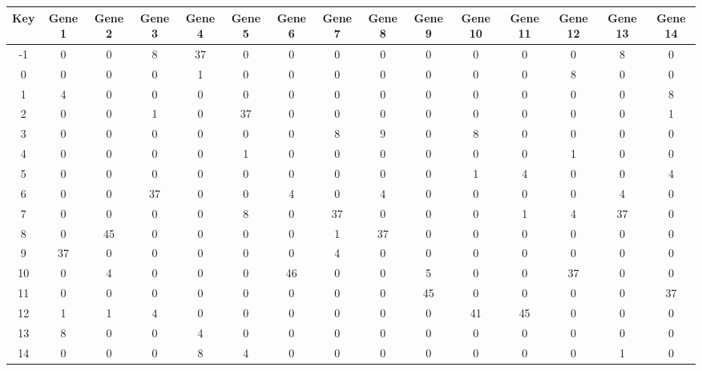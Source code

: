 \begin{tabular}{|c|c|c|c|c|c|c|c|c|c|c|c|c|c|c|}
\hline
Key & Gene 1 & Gene 2 & Gene 3 & Gene 4 & Gene 5 & Gene 6 & Gene 7 & Gene 8 & Gene 9 & Gene 10 & Gene 11 & Gene 12 & Gene 13 & Gene 14 \\
\hline
-1 & 0 & 0 & 8 & 37 & 0 & 0 & 0 & 0 & 0 & 0 & 0 & 0 & 8 & 0 \\
0 & 0 & 0 & 0 & 1 & 0 & 0 & 0 & 0 & 0 & 0 & 0 & 8 & 0 & 0 \\
1 & 4 & 0 & 0 & 0 & 0 & 0 & 0 & 0 & 0 & 0 & 0 & 0 & 0 & 8 \\
2 & 0 & 0 & 1 & 0 & 37 & 0 & 0 & 0 & 0 & 0 & 0 & 0 & 0 & 1 \\
3 & 0 & 0 & 0 & 0 & 0 & 0 & 8 & 9 & 0 & 8 & 0 & 0 & 0 & 0 \\
4 & 0 & 0 & 0 & 0 & 1 & 0 & 0 & 0 & 0 & 0 & 0 & 1 & 0 & 0 \\
5 & 0 & 0 & 0 & 0 & 0 & 0 & 0 & 0 & 0 & 1 & 4 & 0 & 0 & 4 \\
6 & 0 & 0 & 37 & 0 & 0 & 4 & 0 & 4 & 0 & 0 & 0 & 0 & 4 & 0 \\
7 & 0 & 0 & 0 & 0 & 8 & 0 & 37 & 0 & 0 & 0 & 1 & 4 & 37 & 0 \\
8 & 0 & 45 & 0 & 0 & 0 & 0 & 1 & 37 & 0 & 0 & 0 & 0 & 0 & 0 \\
9 & 37 & 0 & 0 & 0 & 0 & 0 & 4 & 0 & 0 & 0 & 0 & 0 & 0 & 0 \\
10 & 0 & 4 & 0 & 0 & 0 & 46 & 0 & 0 & 5 & 0 & 0 & 37 & 0 & 0 \\
11 & 0 & 0 & 0 & 0 & 0 & 0 & 0 & 0 & 45 & 0 & 0 & 0 & 0 & 37 \\
12 & 1 & 1 & 4 & 0 & 0 & 0 & 0 & 0 & 0 & 41 & 45 & 0 & 0 & 0 \\
13 & 8 & 0 & 0 & 4 & 0 & 0 & 0 & 0 & 0 & 0 & 0 & 0 & 0 & 0 \\
14 & 0 & 0 & 0 & 8 & 4 & 0 & 0 & 0 & 0 & 0 & 0 & 0 & 1 & 0 \\
\hline
\end{tabular}
